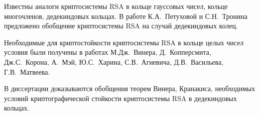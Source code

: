 \documentclass[_00_autoref.tex]{subfiles}
\begin{document}
Известны аналоги криптосистемы RSA в кольце гауссовых чисел, кольце многочленов, дедекиндовых кольцах.
В работе К.А.~Петуховой и С.Н.~Тронина предложено обобщение криптосистемы RSA на случай дедекиндовых колец.

Необходимые для криптостойкости криптосистемы RSA в кольце целых чисел условия были получены в работах М.Дж.~Винера, Д.~Копперсмита, Дж.С.~Корона, А.~Мэй, Ю.С.~Харина, С.В.~Агиевича, Д.В.~Васильева, Г.В.~Матвеева.

В диссертации доказываются обобщения теорем Винера, Кранакиса, необходимых условий криптографической стойкости криптосистемы RSA в дедекиндовых кольцах.
\end{document}
